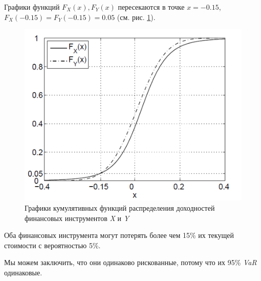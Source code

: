 \documentclass[_fin_decisions_lectures.tex]{subfiles}
\begin{document}
\begin{frame}[shrink=25]
Графики функций $F_X(x), F_Y(x)$ пересекаются в точке $x=-0.15$, $F_X(-0.15)=F_Y(-0.15) = 0.05$ (см. рис. \ref{fig:cdfs}). 
\begin{figure}
	\centering
	\includegraphics[scale=0.6]{img/expected_shortfall_cdfs.png}
	\caption{Графики кумулятивных функций распределения доходностей финансовых инструментов \textit{X }и \textit{Y}}\label{fig:cdfs}
\end{figure}
Оба финансовых инструмента могут потерять более чем 15\% их текущей стоимости с вероятностью 5\%. 

Мы можем заключить, что они одинаково рискованные, потому что их 95\% \textit{VaR} одинаковые.  
\end{frame}
\end{document}
